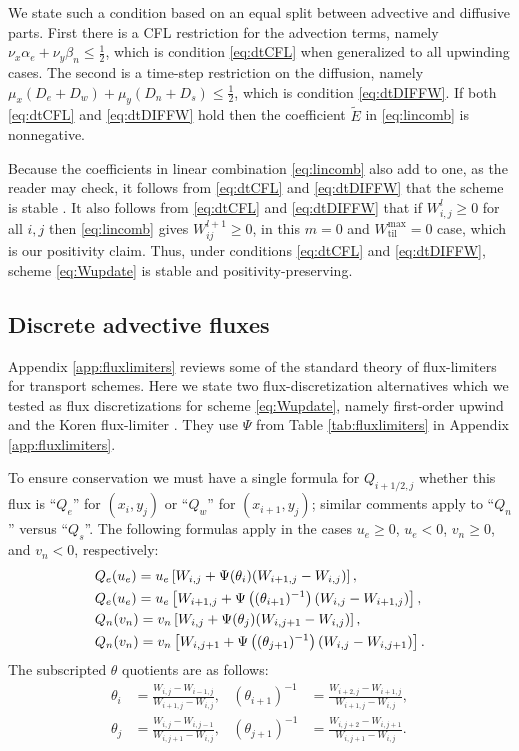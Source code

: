 \documentclass[gmd]{copernicus}   %
\newcommand{\text}{\textrm}
\newcommand{\Wtilmax}{W_{\text{til}}^{\text{max}}}
\newcommand{\Wlij}{W^l_{i,j}}
\begin{document}
We state such a condition based on an equal split between advective and diffusive parts.  First there is a CFL restriction for the advection terms, namely $\nu_x \alpha_e + \nu_y \beta_n \le \frac{1}{2}$, which is condition \eqref{eq:dtCFL} when generalized to all upwinding cases.  The second is a time-step restriction on the diffusion, namely $\mu_x (D_e + D_w) + \mu_y (D_n + D_s) \le \frac{1}{2}$, which is condition \eqref{eq:dtDIFFW}.  If both \eqref{eq:dtCFL} and \eqref{eq:dtDIFFW} hold then the coefficient $\tilde E$ in \eqref{eq:lincomb} is nonnegative.

Because the coefficients in linear combination \eqref{eq:lincomb} also add to one, as the reader may check, it follows  from \eqref{eq:dtCFL} and \eqref{eq:dtDIFFW} that the scheme is stable \citep{MortonMayers}.  It also follows from \eqref{eq:dtCFL} and \eqref{eq:dtDIFFW} that if $\Wlij\ge 0$ for all $i,j$ then \eqref{eq:lincomb} gives $W_{ij}^{l+1}\ge 0$, in this $m=0$ and $\Wtilmax=0$ case, which is our positivity claim.  Thus, under conditions \eqref{eq:dtCFL} and \eqref{eq:dtDIFFW}, scheme \eqref{eq:Wupdate} is stable and positivity-preserving.


\subsection{Discrete advective fluxes}  Appendix \ref{app:fluxlimiters} reviews some of the standard theory of flux-limiters for transport schemes.  Here we state two flux-discretization alternatives which we tested as flux discretizations for scheme \eqref{eq:Wupdate}, namely first-order upwind and the Koren flux-limiter \citep{HundsdorferVerwer2010}.  They use $\Psi$ from Table \ref{tab:fluxlimiters} in Appendix \ref{app:fluxlimiters}.

To ensure conservation we must have a single formula for $Q_{i+1/2,j}$ whether this flux is ``$Q_e$'' for $(x_i,y_j)$ or ``$Q_w$'' for $(x_{i+1},y_j)$; similar comments apply to ``$Q_n$'' versus ``$Q_s$''.  The following formulas apply in the cases $u_e \ge 0$, $u_e < 0$, $v_n \ge 0$, and $v_n < 0$, respectively:
\begin{align}
&Q_e(u_e) = u_e \left[W_{i,j} + \Psi(\theta_{i}) (W_{i+1,j} - W_{i,j})\right], \label{eq:adfluxes} \\ 
&Q_e(u_e) = u_e \left[W_{i+1,j} + \Psi\left((\theta_{i+1})^{-1}\right) (W_{i,j} - W_{i+1,j})\right],  \notag \\
&Q_n(v_n) = v_n \left[W_{i,j} + \Psi(\theta_{j}) (W_{i,j+1} - W_{i,j})\right], \notag \\
&Q_n(v_n) = v_n \left[W_{i,j+1} + \Psi\left((\theta_{j+1})^{-1}\right) (W_{i,j} - W_{i,j+1})\right].\notag
\end{align}
The subscripted $\theta$ quotients are as follows:
\begin{align*}
\theta_i &= \frac{W_{i,j}-W_{i-1,j}}{W_{i+1,j} - W_{i,j}}, & (\theta_{i+1})^{-1} &= \frac{W_{i+2,j}-W_{i+1,j}}{W_{i+1,j} - W_{i,j}}, \\
\theta_j &= \frac{W_{i,j}-W_{i,j-1}}{W_{i,j+1} - W_{i,j}}, & (\theta_{j+1})^{-1} &= \frac{W_{i,j+2}-W_{i,j+1}}{W_{i,j+1} - W_{i,j}}.
\end{align*}
\end{document}
